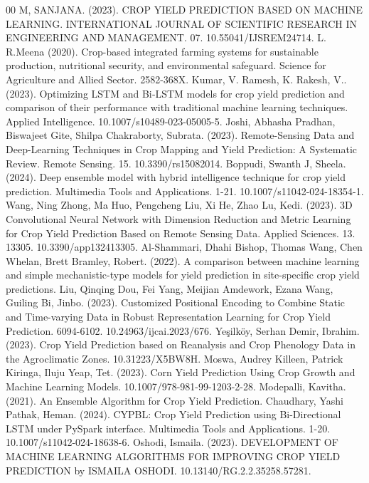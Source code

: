 \documentclass[conference]{IEEEtran}
\begin{document}
\begin{thebibliography}{00}
 M, SANJANA. (2023). CROP YIELD PREDICTION BASED ON MACHINE LEARNING. INTERNATIONAL JOURNAL OF SCIENTIFIC RESEARCH IN ENGINEERING AND MANAGEMENT. 07. 10.55041/IJSREM24714. 
 L. R.Meena (2020). Crop-based integrated farming systems for sustainable production, nutritional security, and environmental safeguard. Science for Agriculture and Allied Sector. 2582-368X.
 Kumar, V. Ramesh, K. Rakesh, V.. (2023). Optimizing LSTM and Bi‑LSTM models for crop yield prediction and comparison of their performance with traditional machine learning techniques. Applied Intelligence. 10.1007/s10489-023-05005-5. 
 Joshi, Abhasha Pradhan, Biswajeet Gite, Shilpa Chakraborty, Subrata. (2023). Remote-Sensing Data and Deep-Learning Techniques in Crop Mapping and Yield Prediction: A Systematic Review. Remote Sensing. 15. 10.3390/rs15082014. 
 Boppudi, Swanth J, Sheela. (2024). Deep ensemble model with hybrid intelligence technique for crop yield prediction. Multimedia Tools and Applications. 1-21. 10.1007/s11042-024-18354-1. 
 Wang, Ning Zhong, Ma Huo, Pengcheng Liu, Xi He, Zhao Lu, Kedi. (2023). 3D Convolutional Neural Network with Dimension Reduction and Metric Learning for Crop Yield Prediction Based on Remote Sensing Data. Applied Sciences. 13. 13305. 10.3390/app132413305. 
 Al-Shammari, Dhahi Bishop, Thomas Wang, Chen Whelan, Brett Bramley, Robert. (2022). A comparison between machine learning and simple mechanistic-type models for yield prediction in site-specific crop yield predictions.
 Liu, Qinqing Dou, Fei Yang, Meijian Amdework, Ezana Wang, Guiling Bi, Jinbo. (2023). Customized Positional Encoding to Combine Static and Time-varying Data in Robust Representation Learning for Crop Yield Prediction. 6094-6102. 10.24963/ijcai.2023/676. 
 Yeşilköy, Serhan Demir, Ibrahim. (2023). Crop Yield Prediction based on Reanalysis and Crop Phenology Data in the Agroclimatic Zones. 10.31223/X5BW8H. 
 Moswa, Audrey Killeen, Patrick Kiringa, Iluju Yeap, Tet. (2023). Corn Yield Prediction Using Crop Growth and Machine Learning Models. 10.1007/978-981-99-1203-2-28. 
 Modepalli, Kavitha. (2021). An Ensemble Algorithm for Crop Yield Prediction. 
 Chaudhary, Yashi Pathak, Heman. (2024). CYPBL: Crop Yield Prediction using Bi-Directional LSTM under PySpark interface. Multimedia Tools and Applications. 1-20. 10.1007/s11042-024-18638-6. 
 Oshodi, Ismaila. (2023). DEVELOPMENT OF MACHINE LEARNING ALGORITHMS FOR IMPROVING CROP YIELD PREDICTION by ISMAILA OSHODI. 10.13140/RG.2.2.35258.57281. 

\end{thebibliography}
\end{document}
